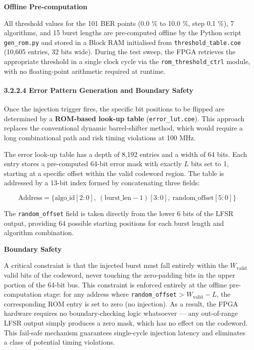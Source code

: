 \textbf{Offline Pre-computation}

All threshold values for the 101 BER points (0.0 \% to 10.0 \%, step 0.1
\%), 7 algorithms, and 15 burst lengths are pre-computed offline by the
Python script \texttt{gen\_rom.py} and stored in a Block RAM initialised
from \texttt{threshold\_table.coe} (10,605 entries, 32 bits wide).
During the test sweep, the FPGA retrieves the appropriate threshold in a
single clock cycle via the \texttt{rom\_threshold\_ctrl} module, with no
floating-point arithmetic required at runtime.

\paragraph{3.2.2.4 Error Pattern Generation and Boundary
Safety}\label{error-pattern-generation-and-boundary-safety}

Once the injection trigger fires, the specific bit positions to be
flipped are determined by a \textbf{ROM-based look-up table}
(\texttt{error\_lut.coe}). This approach replaces the conventional
dynamic barrel-shifter method, which would require a long combinational
path and risk timing violations at 100 MHz.

The error look-up table has a depth of 8,192 entries and a width of 64
bits. Each entry stores a pre-computed 64-bit error mask with exactly
\(L\) bits set to 1, starting at a specific offset within the valid
codeword region. The table is addressed by a 13-bit index formed by
concatenating three fields:

\[\text{Address} = \{ \text{algo\_id}[2:0],\ (\text{burst\_len} - 1)[3:0],\ \text{random\_offset}[5:0] \}\]

The \texttt{random\_offset} field is taken directly from the lower 6
bits of the LFSR output, providing 64 possible starting positions for
each burst length and algorithm combination.

\textbf{Boundary Safety}

A critical constraint is that the injected burst must fall entirely
within the \(W_{\text{valid}}\) valid bits of the codeword, never
touching the zero-padding bits in the upper portion of the 64-bit bus.
This constraint is enforced entirely at the offline pre-computation
stage: for any address where \texttt{random\_offset} \textgreater{}
\(W_{\text{valid}} - L\), the corresponding ROM entry is set to zero (no
injection). As a result, the FPGA hardware requires no boundary-checking
logic whatsoever --- any out-of-range LFSR output simply produces a zero
mask, which has no effect on the codeword. This fail-safe mechanism
guarantees single-cycle injection latency and eliminates a class of
potential timing violations.

